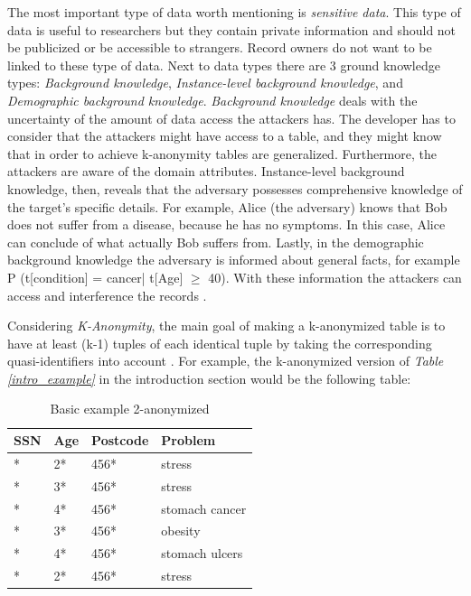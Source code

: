 \documentclass{llncs}
\begin{document}
The most important type of data worth mentioning is \textit{sensitive data}. This type of data is useful to researchers but they contain private information and should not be publicized or be accessible to strangers. Record owners do not want to be linked to these type of data. Next to data types there are 3 ground knowledge types: \textit{Background knowledge}, \textit{Instance-level background knowledge}, and \textit{Demographic background knowledge}. \textit{Background knowledge} deals with the uncertainty of the amount of data access the attackers has. The developer has to consider that the attackers might have access to a table, and they might know that in order to achieve k-anonymity tables are generalized. Furthermore, the attackers are aware of the domain attributes. Instance-level background knowledge, then, reveals that the adversary possesses comprehensive knowledge of the target’s specific details. For example, Alice (the adversary) knows that Bob does not suffer from a disease, because he has no symptoms. In this case, Alice can conclude of what actually Bob suffers from. Lastly, in the demographic background knowledge the adversary is informed about general facts, for example P (t[condition] = cancer| t[Age] $\geq$ 40). With these information the attackers can access and interference the records \cite{ldiversity}.

Considering \textit{K-Anonymity}, the main goal of making a k-anonymized table is to have at least (k-1) tuples of each identical tuple by taking the corresponding quasi-identifiers into account  \cite{sweeney2002k,li2006achieving}. For example, the k-anonymized version of \textit{Table  \ref{intro_example}} in the introduction section would be the following table:
\begin{table}[]
	\centering
	\caption{Basic example 2-anonymized}
	\label{intro_example_sol}
	\begin{tabular}{@{}llll@{}}
		\toprule
		SSN         & Age & Postcode & Problem         \\ \midrule
		* & 2*  & 456*     & stress \\
		* & 3*  & 456*     & stress          \\
		* & 4*  & 456*     & stomach cancer  \\
		* & 3*  & 456*     & obesity         \\
		* & 4*  & 456*     & stomach ulcers  \\
		* & 2*  & 456*     & stress          \\ \bottomrule
	\end{tabular}
\end{table}
\end{document}
